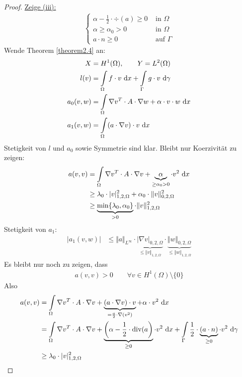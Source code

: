 \begin{proof}
\underline{Zeige (iii):}
\begin{align*}
	\left\{\begin{array}{rl}
\alpha-\frac{1}{2}\cdot\div(a)\geq0&\text{ in }\Omega\\
\alpha\geq\alpha_0>0&\text{ in }\Omega\\
a\cdot n\geq0&\text{ auf }\Gamma
	\end{array}\right.
\end{align*}
Wende Theorem \ref{theorem2.4} an:
\begin{align*}
X&=H^1(\Omega),\qquad Y=L^2(\Omega)\\
l(v)&=\int\limits_\Omega f\cdot v\text{ d} x+\int\limits_\Gamma g\cdot v\text{ d}\gamma\\
a_0(v,w)&=\int\limits_\Omega\nabla v^T\cdot A\cdot\nabla w+\alpha\cdot v\cdot w\text{ d} x\\
a_1(v,w)&=\int\limits_\Omega(a\cdot\nabla v)\cdot v\text{ d} x
\end{align*}
Stetigkeit von $l$ und $a_0$ sowie Symmetrie sind klar. Bleibt nur Koerzivität zu zeigen:
\begin{align*}
a(v,v)&=\int\limits_\Omega\nabla v^T \cdot A \cdot \nabla v+\underbrace{\alpha}_{\geq\alpha_0>0}\cdot v^2\text{ d} x\\
&\geq\lambda_0\cdot|v|^2_{1,2,\Omega}+\alpha_0\cdot\Vert v\Vert^2_{0,2,\Omega}\\
&\geq\underbrace{\min\lbrace\lambda_0,\alpha_0\rbrace}_{>0}\cdot\Vert v\Vert^2_{1,2,\Omega}
\end{align*}
Stetigkeit von $a_1$:
\begin{align*}
\big| a_1(v,w)\big|&\leq\Vert a\Vert_{L^\infty}\cdot\underbrace{|\nabla v|_{0,2,\Omega}}_{\leq\Vert v\Vert_{1,2,\Omega}}\cdot\underbrace{\Vert w\Vert_{0,2,\Omega}}_{\leq\Vert w\Vert_{1,2,\Omega}}
\end{align*}
Es bleibt nur noch zu zeigen, dass
\begin{align*}
a(v,v)>0\qquad\forall v\in H^1(\Omega)\setminus\lbrace0\rbrace
\end{align*}
Also
\begin{align*}
a(v,v)
&=\int\limits_{\Omega} \nabla v^T\cdot A\cdot \nabla v+\underbrace{(a\cdot\nabla v)\cdot v}_{=\frac{a}{2}\cdot\nabla(v^2)}+\alpha\cdot v^2\d x\\
&=\int\limits_{\Omega}\nabla v^T\cdot A\cdot\nabla v+\underbrace{\left(\alpha-\frac{1}{2}\cdot\div(a\right)}_{\geq0}\cdot v^2\d x+\int\limits_\Gamma\frac{1}{2}\cdot\underbrace{(a\cdot n)}_{\geq0}\cdot v^2\d\gamma\\
&\geq\lambda_0\cdot |v|^2_{1,2,\Omega}\\

\end{align*}
\end{proof}

